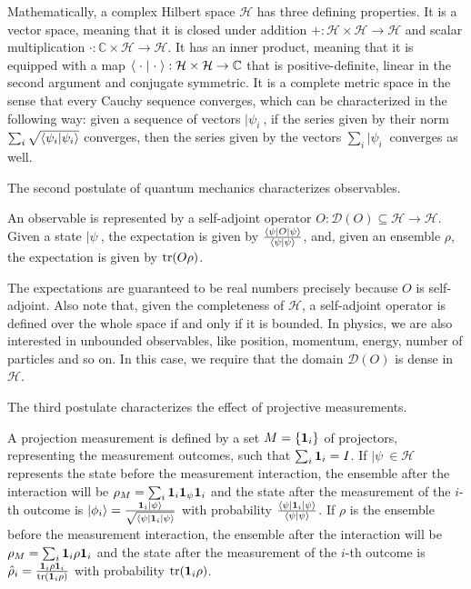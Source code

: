 Mathematically, a complex Hilbert space $\mathcal{H}$ has three defining properties. It is a vector space, meaning that it is closed under addition $+ : \mathcal{H} \times \mathcal{H} \to \mathcal{H}$ and scalar multiplication $\cdot : \mathbb{C} \times \mathcal{H} \to \mathcal{H}$. It has an inner product, meaning that it is equipped with a map $\< \; \cdot \; | \; \cdot \; \> : \mathcal{H} \times \mathcal{H} \to \mathbb{C}$ that is positive-definite, linear in the second argument and conjugate symmetric. It is a complete metric space in the sense that every Cauchy sequence converges,  which can be characterized in the following way: given a sequence of vectors $|\psi_i\>$, if the series given by their norm $\sum_i \sqrt{\<\psi_i|\psi_i\>}$ converges, then the series given by the vectors $\sum_i |\psi_i\>$ converges as well.

The second postulate of quantum mechanics characterizes observables.
\renewcommand{\thepostulate}{OBS}
\begin{postulate}\label{rp_qm_postObs}
	An observable is represented by a self-adjoint operator $O : \mathcal{D}(O) \subseteq \mathcal{H} \to \mathcal{H}$. Given a state $|\psi\>$, the expectation is given by $\frac{\<\psi | O | \psi \>}{\<\psi | \psi \>}$, and, given an ensemble $\rho$, the expectation is given by $\tr(O\rho)$.
\end{postulate}
\renewcommand{\thepostulate}{\Roman{assump}}

The expectations are guaranteed to be real numbers precisely because $O$ is self-adjoint. Also note that, given the completeness of $\mathcal{H}$, a self-adjoint operator is defined over the whole space if and only if it is bounded. In physics, we are also interested in unbounded observables, like position, momentum, energy, number of particles and so on. In this case, we require that the domain $\mathcal{D}(O)$ is dense in $\mathcal{H}$.

The third postulate characterizes the effect of projective measurements.
\renewcommand{\thepostulate}{PROJ}
\begin{postulate}\label{rp_qm_postProjMeas}
	A projection measurement is defined by a set $M = \{\indicator[i]\}$ of projectors, representing the measurement outcomes, such that $\sum_i \indicator[i] = I$. If $|\psi\> \in \mathcal{H}$ represents the state before the measurement interaction, the ensemble after the interaction will be $\rho_{M} = \sum_i \indicator[i] \indicator[\psi] \indicator[i]$ and the state after the measurement of the $i$-th outcome is $|\phi_i\> = \frac{\indicator[i]|\psi\>}{\sqrt{\< \psi | \indicator[i] | \psi \>}}$ with probability $\frac{\<\psi | \indicator[i] | \psi \>}{\<\psi | \psi \>}$. If $\rho$ is the ensemble before the measurement interaction, the ensemble after the interaction will be $\rho_{M} = \sum_i \indicator[i] \rho \indicator[i]$ and the state after the measurement of the $i$-th outcome is $\hat{\rho}_i = \frac{\indicator[i] \rho \indicator[i]}{\tr(\indicator[i] \rho)}$ with probability $\tr(\indicator[i] \rho)$.
\end{postulate}
\renewcommand{\thepostulate}{\Roman{assump}}

